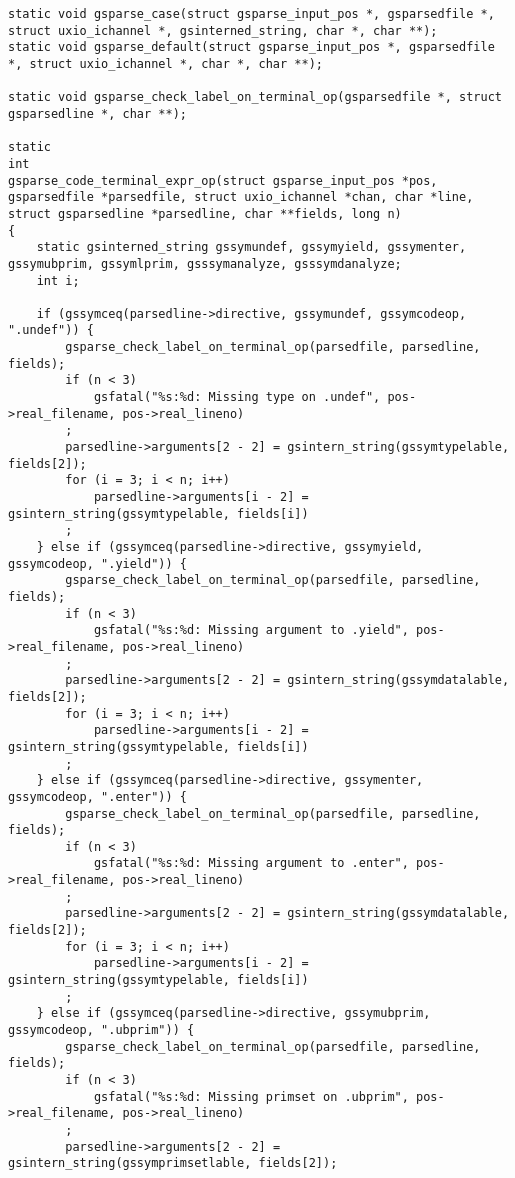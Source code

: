 \documentclass{report}
\begin{document}
\begin{verbatim}
static void gsparse_case(struct gsparse_input_pos *, gsparsedfile *, struct uxio_ichannel *, gsinterned_string, char *, char **);
static void gsparse_default(struct gsparse_input_pos *, gsparsedfile *, struct uxio_ichannel *, char *, char **);

static void gsparse_check_label_on_terminal_op(gsparsedfile *, struct gsparsedline *, char **);

static
int
gsparse_code_terminal_expr_op(struct gsparse_input_pos *pos, gsparsedfile *parsedfile, struct uxio_ichannel *chan, char *line, struct gsparsedline *parsedline, char **fields, long n)
{
    static gsinterned_string gssymundef, gssymyield, gssymenter, gssymubprim, gssymlprim, gsssymanalyze, gsssymdanalyze;
    int i;

    if (gssymceq(parsedline->directive, gssymundef, gssymcodeop, ".undef")) {
        gsparse_check_label_on_terminal_op(parsedfile, parsedline, fields);
        if (n < 3)
            gsfatal("%s:%d: Missing type on .undef", pos->real_filename, pos->real_lineno)
        ;
        parsedline->arguments[2 - 2] = gsintern_string(gssymtypelable, fields[2]);
        for (i = 3; i < n; i++)
            parsedline->arguments[i - 2] = gsintern_string(gssymtypelable, fields[i])
        ;
    } else if (gssymceq(parsedline->directive, gssymyield, gssymcodeop, ".yield")) {
        gsparse_check_label_on_terminal_op(parsedfile, parsedline, fields);
        if (n < 3)
            gsfatal("%s:%d: Missing argument to .yield", pos->real_filename, pos->real_lineno)
        ;
        parsedline->arguments[2 - 2] = gsintern_string(gssymdatalable, fields[2]);
        for (i = 3; i < n; i++)
            parsedline->arguments[i - 2] = gsintern_string(gssymtypelable, fields[i])
        ;
    } else if (gssymceq(parsedline->directive, gssymenter, gssymcodeop, ".enter")) {
        gsparse_check_label_on_terminal_op(parsedfile, parsedline, fields);
        if (n < 3)
            gsfatal("%s:%d: Missing argument to .enter", pos->real_filename, pos->real_lineno)
        ;
        parsedline->arguments[2 - 2] = gsintern_string(gssymdatalable, fields[2]);
        for (i = 3; i < n; i++)
            parsedline->arguments[i - 2] = gsintern_string(gssymtypelable, fields[i])
        ;
    } else if (gssymceq(parsedline->directive, gssymubprim, gssymcodeop, ".ubprim")) {
        gsparse_check_label_on_terminal_op(parsedfile, parsedline, fields);
        if (n < 3)
            gsfatal("%s:%d: Missing primset on .ubprim", pos->real_filename, pos->real_lineno)
        ;
        parsedline->arguments[2 - 2] = gsintern_string(gssymprimsetlable, fields[2]);

\end{verbatim}
\end{document}
